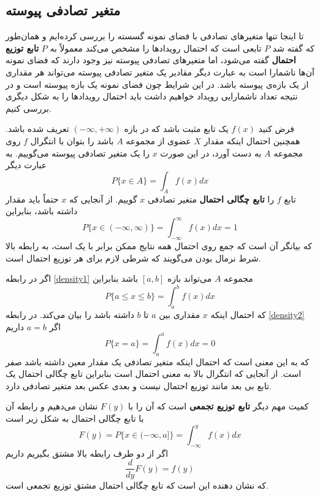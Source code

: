 \subsection{متغیر تصادفی پیوسته}
\label{ch1:sec6}
تا اینجا تنها متغیرهای تصادفی با فضای نمونه گسسته را بررسی کرده‌ایم و همان‌طور که گفته شد  $P$ تابعی است که احتمال رویدادها را مشخص می‌کند معمولاً به $P$ \textbf{تابع توزیع احتمال} گفته می‌شود، اما متغیرهای تصادفی پیوسته نیز وجود دارند که فضای نمونه آن‌ها ناشمارا است به عبارت دیگر مقادیر یک متغیر تصادفی پیوسته می‌تواند هر مقداری از یک بازه‌ی پیوسته باشد. در این شرایط چون فضای نمونه یک بازه پیوسته است و در نتیجه تعداد ناشمارایی رویداد خواهیم داشت باید احتمال رویدادها را به شکل دیگری بررسی کنیم. 

 فرض کنید $f( x )$ یک تابع مثبت باشد که در بازه  $(-\infty, +\infty)$ تعریف شده باشد. همچنین احتمال اینکه مقدار $X$ عضوی از مجموعه $A$ باشد را بتوان با انتگرال $f$ روی مجموعه $A$ به دست آورد، در این صورت $x$ را یک متغیر تصادفی پیوسته می‌گوییم. به عبارت دیگر 
 \begin{equation}
    P\{x \in A\}=\int_{A} f(x) d x
    \label{density1}
\end{equation}
تابع $f$ را \textbf{تابع چگالی احتمال} متغیر تصادفی $x$ گوییم. از آنجایی که $x$ حتماً باید مقدار داشته باشد، بنابراین
\begin{equation}    
    P\{x \in(-\infty, \infty)\}=\int_{-\infty}^{\infty} f(x) d x=1
    \label{p_normalization}
\end{equation}
که بیانگر آن است که جمع روی احتمال همه نتایج ممکن برابر با یک است، به رابطه بالا شرط نرمال بودن می‌گویند که شرطی لازم برای هر توزیع احتمال است.

اگر در رابطه \ref{density1} مجموعه‌ $A$ می‌تواند بازه $[a,b]$ باشد بنابراین
 \begin{equation}
    P\{a \leq x \leq b\}=\int_{a}^{b} f(x) d x
    \label{density2}
\end{equation}
که احتمال اینکه $x$ مقداری بین $a$ تا $b$ داشته باشد را بیان می‌کند. در رابطه \ref{density2} اگر $a=b$ داریم
$$
    P\{x=a\}=\int_{a}^{a} f(x) d x=0
$$
که به این معنی است که احتمال اینکه متغیر تصادفی یک مقدار معین داشته باشد صفر است. از آنجایی که انتگرال بالا به معنی احتمال است بنابراین  تابع چگالی احتمال یک تابع بی بعد مانند توزیع احتمال نیست و بعدی عکس بعد متغیر تصادفی دارد.

کمیت مهم دیگر \textbf{تابع توزیع تجمعی} است که آن را با $F(y)$ نشان می‌دهیم و رابطه آن با تابع چگالی احتمال به شکل زیر است
\begin{equation}
    F(y)=P\{x \in(-\infty, a]\}=\int_{-\infty}^{y} f(x) d x
    \label{cumulative1}
\end{equation}
اگر از دو طرف رابطه بالا مشتق بگیریم داریم
\begin{equation}
    \frac{d}{d y} F(y)=f(y)
    \label{cumulative_density}
\end{equation}
که نشان دهنده این است که تابع چگالی احتمال مشتق توزیع تجمعی است.

